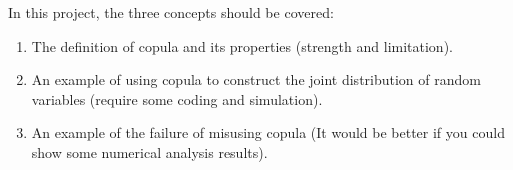 \documentclass{article}
\theoremstyle{definition}
\theoremstyle{remark}
\begin{document}
In this project, the three concepts should be covered:
\begin{enumerate}
    \item The definition of copula and its properties (\eg strength and limitation).
    \item An example of using copula to construct the joint distribution of random variables (require some coding and simulation).
    \item An example of the failure of misusing copula (It would be better if you could show some numerical analysis results).
\end{enumerate}
\end{document}
